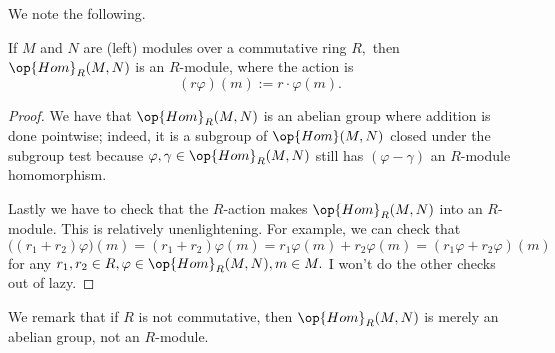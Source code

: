 We note the following.
\begin{proposition}
	If $M$ and $N$ are (left) modules over a commutative ring $R,$ then $\op{Hom}_R(M,N)$ is an $R$-module, where the action is
	\[(r\varphi)(m):=r\cdot\varphi(m).\]
\end{proposition}
\begin{proof}
	We have that $\op{Hom}_R(M,N)$ is an abelian group where addition is done pointwise; indeed, it is a subgroup of $\op{Hom}(M,N)$ closed under the subgroup test because $\varphi,\gamma\in\op{Hom}_R(M,N)$ still has $(\varphi-\gamma)$ an $R$-module homomorphism.

	Lastly we have to check that the $R$-action makes $\op{Hom}_R(M,N)$ into an $R$-module. This is relatively unenlightening. For example, we can check that
	\[\big((r_1+r_2)\varphi\big)(m)=(r_1+r_2)\varphi(m)=r_1\varphi(m)+r_2\varphi(m)=(r_1\varphi+r_2\varphi)(m)\]
	for any $r_1,r_2\in R,\varphi\in\op{Hom}_R(M,N),m\in M.$ I won't do the other checks out of lazy.
\end{proof}
We remark that if $R$ is not commutative, then $\op{Hom}_R(M,N)$ is merely an abelian group, not an $R$-module.

